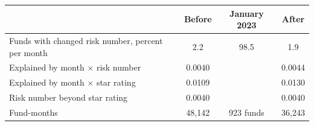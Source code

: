 \begin{tabular}{lccc}
\toprule
 & Before & January 2023 & After \\
\midrule
Funds with changed risk number, percent per month & 2.2 & 98.5 & 1.9 \\
Explained by month $\times$ risk number & 0.0040 & & 0.0044 \\
Explained by month $\times$ star rating & 0.0109 & & 0.0130 \\
Risk number beyond star rating & 0.0040 & & 0.0040 \\
Fund-months & 48,142 & 923 funds & 36,243 \\
\bottomrule
\end{tabular}
